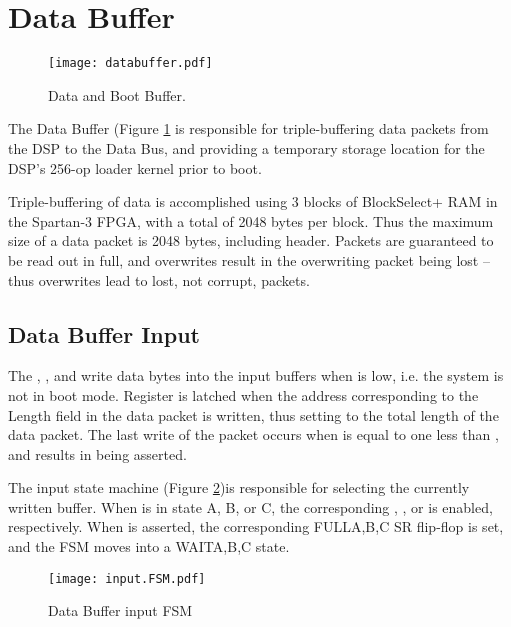 
\section{Data Buffer}

\begin{figure}[h!]
  \texttt{[image: databuffer.pdf]}
  \caption{Data and Boot Buffer.}
  \label{databuffer}
\end{figure}

The Data Buffer (Figure \ref{databuffer} is responsible for
triple-buffering data packets from the DSP to the Data Bus, and
providing a temporary storage location for the DSP's 256-op loader
kernel prior to boot.
    
Triple-buffering of data is accomplished using 3 blocks of
BlockSelect+ RAM in the Spartan-3 FPGA, with a total of 2048 bytes per
block. Thus the maximum size of a data packet is 2048 bytes, including
header. Packets are guaranteed to be read out in full, and overwrites
result in the overwriting packet being lost -- thus overwrites lead to
lost, not corrupt, packets.


\subsection{Data Buffer Input}
        
      
The , , and  write
data bytes into the input buffers when  is low, i.e. the
system is not in boot mode. Register  is latched
when the address corresponding to the Length field in the data packet
is written, thus setting  to the total length of
the data packet. The last write of the packet occurs when
 is equal to one less than ,
and results in  being asserted.

The input state machine  (Figure \ref{InputFSM})is
responsible for selecting the currently written buffer. When
 is in state A, B, or C, the corresponding
, , or  is enabled,
respectively. When  is asserted, the corresponding
FULL{A,B,C} SR flip-flop is set, and the FSM moves into a WAIT{A,B,C}
state.

      
\begin{figure}[h!]
  \texttt{[image: input.FSM.pdf]}
  \caption{Data Buffer input FSM}
  \label{InputFSM}
\end{figure}

